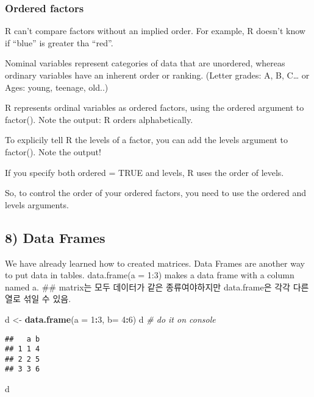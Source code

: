 \documentclass[
]{article}
\newenvironment{Shaded}{\begin{snugshade}}{\end{snugshade}}
\newcommand{\CommentTok}[1]{\textcolor[rgb]{0.56,0.35,0.01}{\textit{#1}}}
\newcommand{\DataTypeTok}[1]{\textcolor[rgb]{0.13,0.29,0.53}{#1}}
\newcommand{\DecValTok}[1]{\textcolor[rgb]{0.00,0.00,0.81}{#1}}
\newcommand{\KeywordTok}[1]{\textcolor[rgb]{0.13,0.29,0.53}{\textbf{#1}}}
\newcommand{\NormalTok}[1]{#1}
\newcommand{\OperatorTok}[1]{\textcolor[rgb]{0.81,0.36,0.00}{\textbf{#1}}}
\newcommand{\StringTok}[1]{\textcolor[rgb]{0.31,0.60,0.02}{#1}}
\begin{document}
\hypertarget{ordered-factors}{%
\subsubsection{Ordered factors}\label{ordered-factors}}

R can't compare factors without an implied order. For example, R doesn't
know if ``blue'' is greater tha ``red''.

Nominal variables represent categories of data that are unordered,
whereas ordinary variables have an inherent order or ranking. (Letter
grades: A, B, C\ldots{} or Ages: young, teenage, old..)

R represents ordinal variables as ordered factors, using the ordered
argument to factor(). Note the output: R orders alphabetically.

To explicily tell R the levels of a factor, you can add the levels
argument to factor(). Note the output!

If you specify both ordered = TRUE and levels, R uses the order of
levels.

So, to control the order of your ordered factors, you need to use the
ordered and levels arguments.

\hypertarget{data-frames}{%
\subsection{8) Data Frames}\label{data-frames}}

We have already learned how to created matrices. Data Frames are another
way to put data in tables. data.frame(a = 1:3) makes a data frame with a
column named a. \#\# matrix는 모두 데이터가 같은 종류여야하지만
data.frame은 각각 다른 열로 섞일 수 있음.

\begin{Shaded}
\begin{Highlighting}[]
\NormalTok{d <-}\StringTok{ }\KeywordTok{data.frame}\NormalTok{(}\DataTypeTok{a =} \DecValTok{1}\OperatorTok{:}\DecValTok{3}\NormalTok{, }\DataTypeTok{b=} \DecValTok{4}\OperatorTok{:}\DecValTok{6}\NormalTok{)}
\NormalTok{d }\CommentTok{# do it on console}
\end{Highlighting}
\end{Shaded}

\begin{verbatim}
##   a b
## 1 1 4
## 2 2 5
## 3 3 6
\end{verbatim}

\begin{Shaded}
\begin{Highlighting}[]
\NormalTok{d}
\end{Highlighting}
\end{Shaded}
\end{document}
